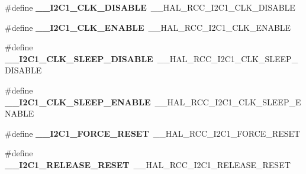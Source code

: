 \begin{DoxyCompactItemize}
\item 
\hypertarget{group___h_a_l___r_c_c___aliased_gad83d5f0a6ae6eef9cf5a0daf817c8e41}{\#define {\bfseries \-\_\-\-\_\-\-I2\-C1\-\_\-\-C\-L\-K\-\_\-\-D\-I\-S\-A\-B\-L\-E}~\-\_\-\-\_\-\-H\-A\-L\-\_\-\-R\-C\-C\-\_\-\-I2\-C1\-\_\-\-C\-L\-K\-\_\-\-D\-I\-S\-A\-B\-L\-E}\label{group___h_a_l___r_c_c___aliased_gad83d5f0a6ae6eef9cf5a0daf817c8e41}

\item 
\hypertarget{group___h_a_l___r_c_c___aliased_ga57473cd6a4f76fedbac6dae08c8c6e78}{\#define {\bfseries \-\_\-\-\_\-\-I2\-C1\-\_\-\-C\-L\-K\-\_\-\-E\-N\-A\-B\-L\-E}~\-\_\-\-\_\-\-H\-A\-L\-\_\-\-R\-C\-C\-\_\-\-I2\-C1\-\_\-\-C\-L\-K\-\_\-\-E\-N\-A\-B\-L\-E}\label{group___h_a_l___r_c_c___aliased_ga57473cd6a4f76fedbac6dae08c8c6e78}

\item 
\hypertarget{group___h_a_l___r_c_c___aliased_ga7bbdc41f3b1b13f8fe2a9c090050ed7f}{\#define {\bfseries \-\_\-\-\_\-\-I2\-C1\-\_\-\-C\-L\-K\-\_\-\-S\-L\-E\-E\-P\-\_\-\-D\-I\-S\-A\-B\-L\-E}~\-\_\-\-\_\-\-H\-A\-L\-\_\-\-R\-C\-C\-\_\-\-I2\-C1\-\_\-\-C\-L\-K\-\_\-\-S\-L\-E\-E\-P\-\_\-\-D\-I\-S\-A\-B\-L\-E}\label{group___h_a_l___r_c_c___aliased_ga7bbdc41f3b1b13f8fe2a9c090050ed7f}

\item 
\hypertarget{group___h_a_l___r_c_c___aliased_gae34832665142d53a98bf833c9f9558b8}{\#define {\bfseries \-\_\-\-\_\-\-I2\-C1\-\_\-\-C\-L\-K\-\_\-\-S\-L\-E\-E\-P\-\_\-\-E\-N\-A\-B\-L\-E}~\-\_\-\-\_\-\-H\-A\-L\-\_\-\-R\-C\-C\-\_\-\-I2\-C1\-\_\-\-C\-L\-K\-\_\-\-S\-L\-E\-E\-P\-\_\-\-E\-N\-A\-B\-L\-E}\label{group___h_a_l___r_c_c___aliased_gae34832665142d53a98bf833c9f9558b8}

\item 
\hypertarget{group___h_a_l___r_c_c___aliased_gae84da6d623ad78feba69961ea4f776bf}{\#define {\bfseries \-\_\-\-\_\-\-I2\-C1\-\_\-\-F\-O\-R\-C\-E\-\_\-\-R\-E\-S\-E\-T}~\-\_\-\-\_\-\-H\-A\-L\-\_\-\-R\-C\-C\-\_\-\-I2\-C1\-\_\-\-F\-O\-R\-C\-E\-\_\-\-R\-E\-S\-E\-T}\label{group___h_a_l___r_c_c___aliased_gae84da6d623ad78feba69961ea4f776bf}

\item 
\hypertarget{group___h_a_l___r_c_c___aliased_gae58af756d3706dcb17376b4674e70ed8}{\#define {\bfseries \-\_\-\-\_\-\-I2\-C1\-\_\-\-R\-E\-L\-E\-A\-S\-E\-\_\-\-R\-E\-S\-E\-T}~\-\_\-\-\_\-\-H\-A\-L\-\_\-\-R\-C\-C\-\_\-\-I2\-C1\-\_\-\-R\-E\-L\-E\-A\-S\-E\-\_\-\-R\-E\-S\-E\-T}\label{group___h_a_l___r_c_c___aliased_gae58af756d3706dcb17376b4674e70ed8}


\end{DoxyCompactItemize}
